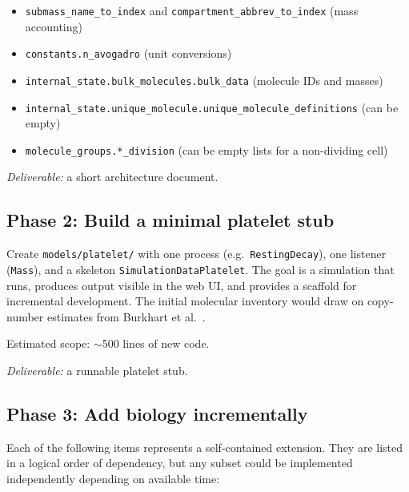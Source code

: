 \documentclass[11pt,a4paper]{article}
\begin{document}
\begin{itemize}[nosep]
  \item \texttt{submass\_name\_to\_index} and
    \texttt{compartment\_abbrev\_to\_index} (mass accounting)
  \item \texttt{constants.n\_avogadro} (unit conversions)
  \item \texttt{internal\_state.bulk\_molecules.bulk\_data} (molecule IDs and
    masses)
  \item \texttt{internal\_state.unique\_molecule.unique\_molecule\_definitions}
    (can be empty)
  \item \texttt{molecule\_groups.*\_division} (can be empty lists for a
    non-dividing cell)
\end{itemize}

\emph{Deliverable:} a short architecture document.

\subsection{Phase 2: Build a minimal platelet stub}

Create \texttt{models/platelet/} with one process (e.g.\
\texttt{RestingDecay}), one listener (\texttt{Mass}), and a skeleton
\texttt{SimulationDataPlatelet}.  The goal is a simulation that runs, produces
output visible in the web UI, and provides a scaffold for incremental
development.  The initial molecular inventory would draw on copy-number
estimates from Burkhart et al.~\cite{Burkhart2012}.

Estimated scope: $\sim$500 lines of new code.

\emph{Deliverable:} a runnable platelet stub.

\subsection{Phase 3: Add biology incrementally}

Each of the following items represents a self-contained extension.  They are
listed in a logical order of dependency, but any subset could be implemented
independently depending on available time:
\end{document}
